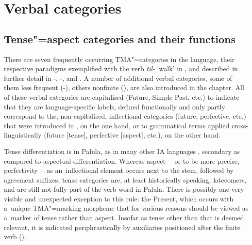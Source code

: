 \chapter{Verbal categories}
\label{chap:9}

\section{Tense"=aspect categories and their functions}
\label{sec:9-1}


There are seven frequently occurring TMA"=categories in the language, their respective paradigms exemplified with the verb \textit{til-} `walk' in , and described in further detail in -, -, and . A number of additional verbal categories, some of them less frequent (-), others nonfinite (), are also introduced in the chapter. All of these verbal categories are capitalised (Future, Simple Past, etc.) to indicate that they are language-specific labels, defined functionally and only partly correspond to the, non-capitalised, inflectional categories (future, perfective, etc.) that were introduced in , on the one hand, or to grammatical terms applied cross-linguistically (future [tense], perfective [aspect], etc.), on the other hand.  


Tense differentiation is in Palula, as in many other IA languages \citep[262]{masica1991}, secondary as compared to aspectual differentiation. Whereas aspect~-- or to be more precise, perfectivity~-- as an~inflectional element occurs next to the stem, followed by agreement suffixes, tense categories are, at least historically speaking, latecomers, and are still not fully part of the verb word in Palula. There is possibly one very visible and unexpected exception to this rule: the Present, which occurs with a~unique TMA"=marking morpheme that for various reasons should be viewed as a~marker of tense rather than aspect. Insofar as tense other than that is deemed relevant, it is indicated periphrastically by auxiliaries positioned after the finite verb (). 


